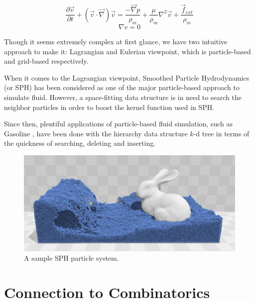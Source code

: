 \documentclass[12pt, a4paper]{article}
\begin{document}
        \begin{equation}
        \frac{\partial \overrightarrow v}{\partial t} + ({\overrightarrow v}\cdot{\overrightarrow \nabla}){\overrightarrow v} = \frac{-\overrightarrow \nabla p}{\rho_m} + \frac{\mu}{\rho_m}{ \nabla^2}{\overrightarrow v} + \frac{\overrightarrow f_{ext}}{\rho_m}
        \label{e1}
        \end{equation}
        \begin{equation}
        {\nabla v} = {0}
        \label{e0}
        \end{equation}

        Though it seems extremely complex at first glance, we have two intuitive approach to make it: Lagrangian and Eulerian viewpoint, which is particle-based and grid-based respectively.

        When it comes to the Lagrangian viewpoint, Smoothed Particle Hydrodynamics \cite{Muller:2003:PFS:846276.846298} (or SPH) has been considered as one of the major particle-based approach to simulate fluid. However, a space-fitting data structure is in need to search the neighbor particles in order to boost the kernel function used in SPH.

        Since then, plentiful applications of particle-based fluid simulation, such as Gasoline \cite{WADSLEY2004137}, have been done with the hierarchy data structure $k$-d tree in terms of the quickness of searching, deleting and inserting.

        \begin{figure}[ht]
            \centering
            \includegraphics[width=13cm]{sph.png}
            \caption{A sample SPH particle system.}
        \end{figure}

    \section{Connection to Combinatorics}
\end{document}

